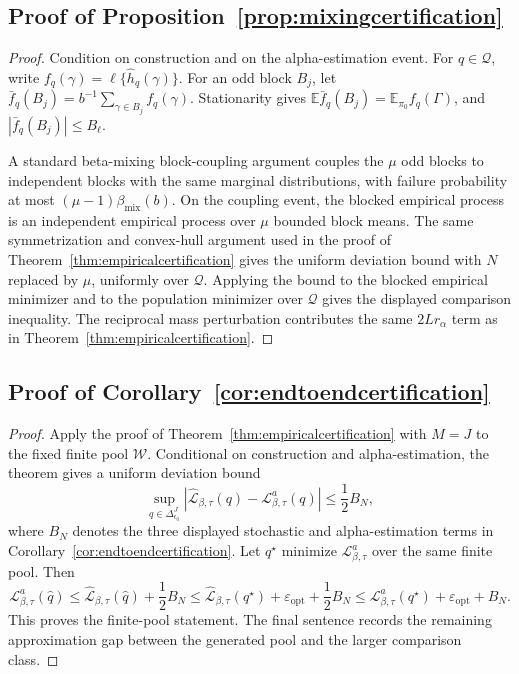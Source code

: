\documentclass[twoside,11pt]{article}
\newcommand{\E}{\mathbb{E}}
\begin{document}
\subsection{Proof of Proposition~\ref{prop:mixingcertification}}

\begin{proof} Condition on construction and on the alpha-estimation event. For \(q\in\mathcal Q\), write \(f_q(\gamma)=\ell\{\widehat h_q(\gamma)\}\). For an odd block \(B_j\), let \(\bar f_q(B_j)=b^{-1}\sum_{\gamma\in B_j}f_q(\gamma)\). Stationarity gives \(\E\bar f_q(B_j)=\E_{\pi_0}f_q(\Gamma)\), and \(|\bar f_q(B_j)|\le B_\ell\).

A standard beta-mixing block-coupling argument couples the \(\mu\) odd blocks to independent blocks with the same marginal distributions, with failure probability at most \((\mu-1)\beta_{\mathrm{mix}}(b)\). On the coupling event, the blocked empirical process is an independent empirical process over \(\mu\) bounded block means. The same symmetrization and convex-hull argument used in the proof of Theorem~\ref{thm:empiricalcertification} gives the uniform deviation bound with \(N\) replaced by \(\mu\), uniformly over \(\mathcal Q\). Applying the bound to the blocked empirical minimizer and to the population minimizer over \(\mathcal Q\) gives the displayed comparison inequality. The reciprocal mass perturbation contributes the same \(2Lr_\alpha\) term as in Theorem~\ref{thm:empiricalcertification}.
\end{proof}

\subsection{Proof of Corollary~\ref{cor:endtoendcertification}}

\begin{proof} Apply the proof of Theorem~\ref{thm:empiricalcertification} with \(M=J\) to the fixed finite pool \(\mathcal W\). Conditional on construction and alpha-estimation, the theorem gives a uniform deviation bound
\[
\sup_{q\in\Delta_{\epsilon_0}^{J}} \left| \widehat{\mathcal L}_{\beta,\tau}(q) - \mathcal L_{\beta,\tau}^a(q) \right| \le \frac12 B_N,
\]
where \(B_N\) denotes the three displayed stochastic and alpha-estimation terms in Corollary~\ref{cor:endtoendcertification}. Let \(q^\star\) minimize \(\mathcal L_{\beta,\tau}^a\) over the same finite pool. Then
\[
\mathcal L_{\beta,\tau}^a(\widehat q) \le \widehat{\mathcal L}_{\beta,\tau}(\widehat q) + \frac12 B_N \le \widehat{\mathcal L}_{\beta,\tau}(q^\star) + \varepsilon_{\mathrm{opt}} + \frac12 B_N \le \mathcal L_{\beta,\tau}^a(q^\star) + \varepsilon_{\mathrm{opt}} + B_N.
\]
This proves the finite-pool statement. The final sentence records the remaining approximation gap between the generated pool and the larger comparison class.
\end{proof}
\end{document}
